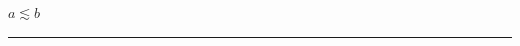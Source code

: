 \documentclass[a4paper,amsmath,amssymb,onecolumn,unpublished]{quantumarticle}
\begin{document}
$a \lesssim b$
\begin{center}
\rule{1cm}{1cm}
\end{center}
\restoregeometry
\end{document}
